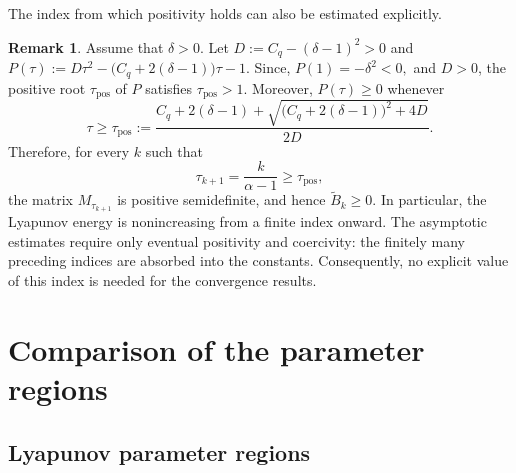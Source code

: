 \documentclass[11pt]{article}
\theoremstyle{plain}
\theoremstyle{definition}
\newtheorem{remark}[theorem]{Remark}
\begin{document}
The index from which positivity holds can also be estimated explicitly.
\begin{remark}
Assume that $\delta>0$.
Let $
D:=C_q-(\delta-1)^2>0$ and $
P(\tau):=
D\tau^2-\bigl(C_q+2(\delta-1)\bigr)\tau-1.$
Since, $
P(1)=-\delta^2<0,$
and $D>0$, the positive root $\tau_{\mathrm{pos}}$ of $P$ satisfies
$\tau_{\mathrm{pos}}>1$. Moreover, $P(\tau)\geq0$ whenever
$$
\tau\geq\tau_{\mathrm{pos}}
:=
\frac{C_q+2(\delta-1)
+\sqrt{\bigl(C_q+2(\delta-1)\bigr)^2+4D}}{2D}.
$$
Therefore, for every $k$ such that
$$
\tau_{k+1}=\frac{k}{\alpha-1}\geq\tau_{\mathrm{pos}},
$$
the matrix $M_{\tau_{k+1}}$ is positive semidefinite, and hence
$\widetilde B_k\geq0$. In particular, the Lyapunov energy is nonincreasing
from a finite index onward. The asymptotic estimates require only eventual
positivity and coercivity: the finitely many preceding indices are absorbed
into the constants. Consequently, no explicit value of this index is needed
for the convergence results.
\end{remark}
\section{Comparison of the parameter regions}\label{sec:comparison}
\subsection{Lyapunov parameter regions}
\end{document}
